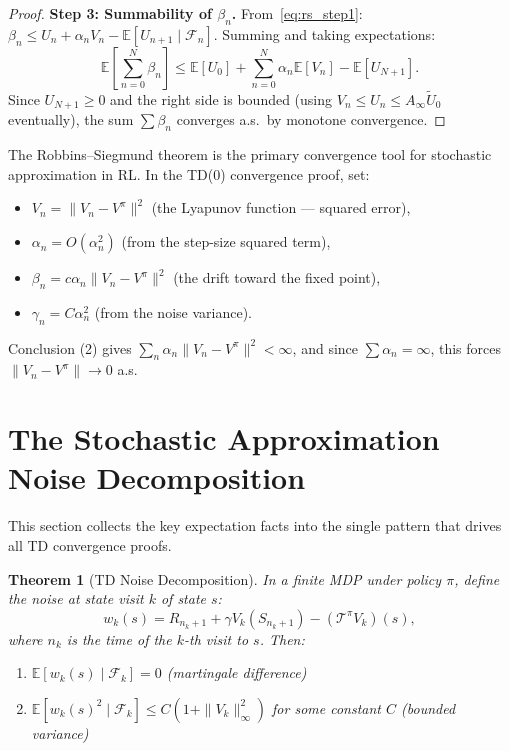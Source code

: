 \documentclass[11pt,a4paper]{article}
\theoremstyle{definition}
\theoremstyle{plain}
\newtheorem{theorem}{Theorem}[section]
\theoremstyle{remark}
\newcommand{\E}{\mathbb{E}}
\begin{document}
\begin{proof}
\textbf{Step 3: Summability of $\beta_n$.}
From~\eqref{eq:rs_step1}: $\beta_n \leq U_n + \alpha_n V_n - \E[U_{n+1} \mid \mathcal{F}_n]$. Summing and taking expectations:
\begin{equation}
    \E\!\left[\sum_{n=0}^N \beta_n\right] \leq \E[U_0] + \sum_{n=0}^N \alpha_n \E[V_n] - \E[U_{N+1}].
\end{equation}
Since $U_{N+1} \geq 0$ and the right side is bounded (using $V_n \leq U_n \leq A_\infty \tilde{U}_0$ eventually), the sum $\sum \beta_n$ converges a.s.\ by monotone convergence.
\end{proof}

\begin{rlconnection}[Connection to RL]
The Robbins--Siegmund theorem is the primary convergence tool for stochastic approximation in RL. In the TD(0) convergence proof, set:
\begin{itemize}[nosep]
    \item $V_n = \|V_n - V^\pi\|^2$ (the Lyapunov function --- squared error),
    \item $\alpha_n = O(\alpha_n^2)$ (from the step-size squared term),
    \item $\beta_n = c \alpha_n \|V_n - V^\pi\|^2$ (the drift toward the fixed point),
    \item $\gamma_n = C \alpha_n^2$ (from the noise variance).
\end{itemize}
Conclusion (2) gives $\sum_n \alpha_n \|V_n - V^\pi\|^2 < \infty$, and since $\sum \alpha_n = \infty$, this forces $\|V_n - V^\pi\| \to 0$ a.s.
\end{rlconnection}

\section{The Stochastic Approximation Noise Decomposition}
\label{sec:noise}

This section collects the key expectation facts into the single pattern that drives all TD convergence proofs.

\begin{theorem}[TD Noise Decomposition]
\label{thm:noise_decomp}
In a finite MDP under policy $\pi$, define the noise at state visit $k$ of state $s$:
\begin{equation}
    w_k(s) = R_{n_k+1} + \gamma V_k(S_{n_k+1}) - (\mathcal{T}^\pi V_k)(s),
    \label{eq:noise_def}
\end{equation}
where $n_k$ is the time of the $k$-th visit to $s$. Then:
\begin{enumerate}[nosep]
    \item $\E[w_k(s) \mid \mathcal{F}_k] = 0$ \hfill (martingale difference)
    \item $\E[w_k(s)^2 \mid \mathcal{F}_k] \leq C(1 + \|V_k\|_\infty^2)$ for some constant $C$ \hfill (bounded variance)
\end{enumerate}
\end{theorem}
\end{document}
